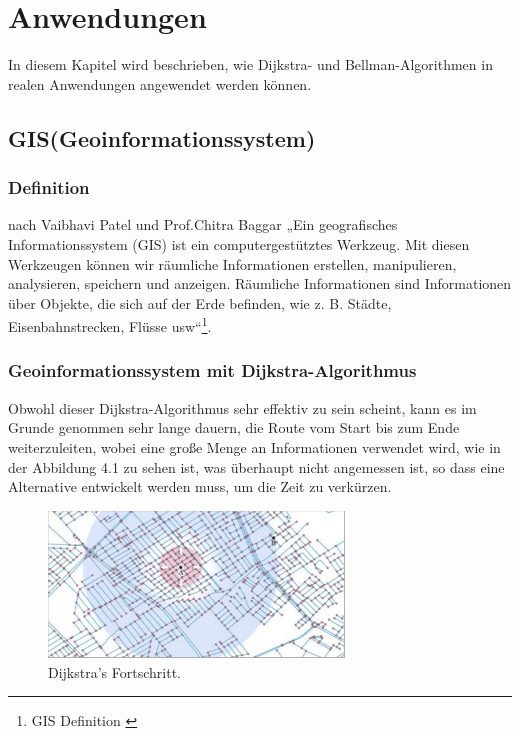 \chapter{Anwendungen}


In diesem Kapitel wird beschrieben, wie Dijkstra- und Bellman-Algorithmen in realen Anwendungen angewendet werden können.

\section{GIS(Geoinformationssystem)}

\subsection{Definition}


nach Vaibhavi Patel und Prof.Chitra Baggar „Ein geografisches Informationssystem (GIS) ist ein computergestütztes Werkzeug. Mit diesen Werkzeugen können wir räumliche Informationen erstellen, manipulieren, analysieren, speichern und anzeigen. Räumliche Informationen sind Informationen über Objekte, die sich auf der Erde befinden, wie z. B. Städte, Eisenbahnstrecken, Flüsse usw“\footnote{GIS Definition \cite{Research-id10}}. 

\subsection{Geoinformationssystem mit Dijkstra-Algorithmus}
Obwohl dieser Dijkstra-Algorithmus sehr effektiv zu sein scheint, kann es im Grunde genommen sehr lange dauern, die Route vom Start bis zum Ende weiterzuleiten, wobei eine große Menge an Informationen verwendet wird, wie in der Abbildung 4.1 zu sehen ist, was überhaupt nicht angemessen ist, so dass eine Alternative entwickelt werden muss, um die Zeit zu verkürzen\cite{Research-id11}.

\begin{figure}[H]
	\centering
	\includegraphics[width=0.7\textwidth]{images/GIS_red.PNG}
	\caption{\label{fig:GIS_red}Dijkstra's Fortschritt\cite{Research-id11}.}
\end{figure}

